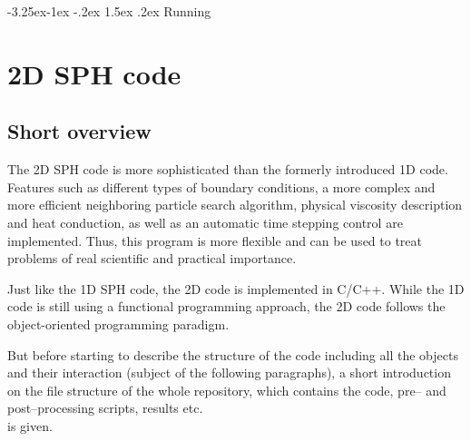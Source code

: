 \documentclass{report}
\makeatletter
\renewcommand\paragraph{\@startsection{paragraph}{4}{\z@}%
  {-3.25ex\@plus -1ex \@minus -.2ex}%
  {1.5ex \@plus .2ex}%
  {\normalfont\normalsize\bfseries}}
\makeatother
\begin{document}
\paragraph{Running}

\section{2D SPH code}
\label{sec:2DSPHcode}
\subsection{Short overview}
\label{sec:shortOverview2D}
The 2D SPH code is more sophisticated than the formerly introduced 1D code. Features such as different types of boundary conditions, a more complex and more efficient neighboring particle search algorithm, physical viscosity description and heat conduction, as well as an automatic time stepping control are implemented. Thus, this program is more flexible and can be used to treat problems of real scientific and practical importance. 

Just like the 1D SPH code, the 2D code is implemented in C/C++. While the 1D code is still using a functional programming approach, the 2D code follows the object-oriented programming paradigm.

But before starting to describe the structure of the code including all the objects and their interaction (subject of the following paragraphs), a short introduction on the file structure of the whole repository, which contains the code, pre-- and post--processing scripts, results etc.\\ is given.
\end{document}

